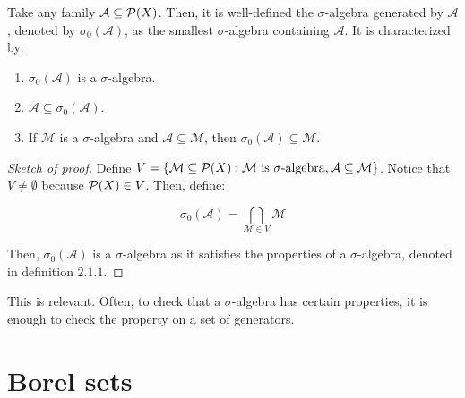 \begin{ftheorem}
    Take any family $\mathcal{A} \subseteq \mathcal{P}(X)$. Then, it is well-defined
    the $\sigma$-algebra generated by $\mathcal{A}$, denoted by $\sigma_0(\mathcal{A})$,
    as the smallest $\sigma$-algebra containing $\mathcal{A}$. It is characterized by:

    \vspace{1em}

    \begin{enumerate}[label=(\roman*)]
        \item $\sigma_0(\mathcal{A})$ is a $\sigma$-algebra.
        
        \vspace{1em}

        \item $\mathcal{A} \subseteq \sigma_0(\mathcal{A})$.
        
        \vspace{1em}

        \item If $\mathcal{M}$ is a $\sigma$-algebra and $\mathcal{A} \subseteq \mathcal{M}$, then
        $\sigma_0(\mathcal{A}) \subseteq \mathcal{M}$.
    \end{enumerate}
\end{ftheorem}

\begin{proof}[Sketch of proof]
    Define $V = \{\mathcal{M} \subseteq \mathcal{P}(X): \mathcal{M} \text{ is } \sigma\text{-algebra}, \mathcal{A} \subseteq \mathcal{M}\}$.
    Notice that $V \neq \emptyset$ because $\mathcal{P}(X) \in V$. Then, define:

    $$\sigma_0(\mathcal{A}) = \bigcap_{\mathcal{M} \in V} \mathcal{M}$$

    Then, $\sigma_0(\mathcal{A})$ is a $\sigma$-algebra as it satisfies the properties of a $\sigma$-algebra, denoted
    in definition $2.1.1$.

\end{proof}

\begin{fremark}
    This is relevant. Often, to check that a $\sigma$-algebra has certain properties, 
    it is enough to check the property on a set of generators.
\end{fremark}

\section{Borel sets}

